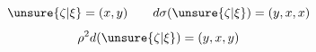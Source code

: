 
\[
\unsure{\zeta|\xi}=(x,y)\qquad d\sigma(\unsure{\zeta|\xi})=(y,x,x)
\]
\[
\rho^2d(\unsure{\zeta|\xi})=(y,x,y)
\]


